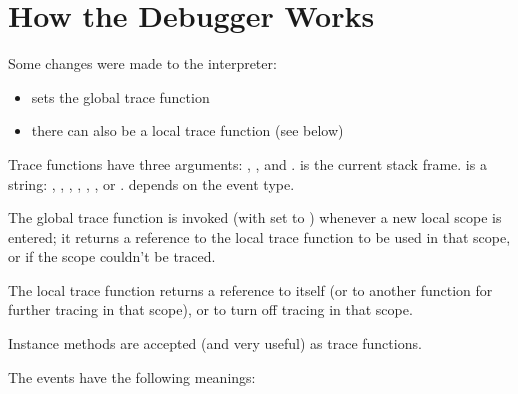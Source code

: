 \section{How the Debugger Works \label{debugger-hooks}}

Some changes were made to the interpreter:

\begin{itemize}
\item {} sets the global trace function
\item there can also be a local trace function (see below)
\end{itemize}

Trace functions have three arguments: , , and
.  is the current stack frame.   is a
string: , , , ,
 , , or . 
 depends on the event type.

The global trace function is invoked (with  set to
) whenever a new local scope is entered; it returns
a reference to the local trace function to be used in that scope, or
 if the scope couldn't be traced.

The local trace function  returns a reference to itself (or to
another function for further tracing in that scope), or  to
turn off tracing in that scope.

Instance methods are accepted (and very useful) as trace functions.

The events have the following meanings:

